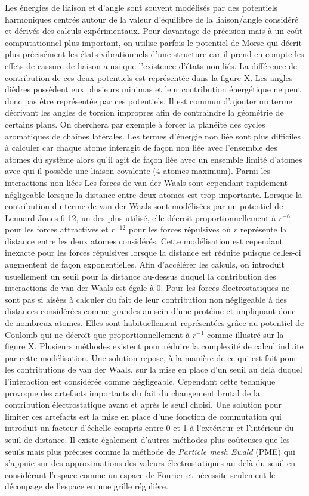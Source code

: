 Les énergies de liaison et d'angle sont souvent modélisés par des potentiels harmoniques centrés autour de la valeur d'équilibre de la liaison/angle considéré et dérivés des calculs expérimentaux. Pour davantage de précision mais à un coût computationnel plus important, on utilise parfois le potentiel de Morse qui décrit plus précisément les états vibrationnels d'une structure car il prend en compte les effets de cassure de liaison ainsi que l'existence d'états non liés. La différence de contribution de ces deux potentiels est représentée dans la figure X. Les angles dièdres possèdent eux plusieurs minimas et leur contribution énergétique ne peut donc pas être représentée par ces potentiels. Il est commun d'ajouter un terme décrivant les angles de torsion impropres afin de contraindre la géométrie de certains plans. On cherchera par exemple à forcer la planéité des cycles aromatiques de chaînes latérales.
Les termes d'énergie non liée sont plus difficiles à calculer car chaque atome interagit de façon non liée avec l'ensemble des atomes du système alors qu'il agit de façon liée avec un ensemble limité d'atomes avec qui il possède une liaison covalente (4 atomes maximum). 
Parmi les interactions non liées Les forces de van der Waals sont cependant rapidement négligeable lorsque la distance entre deux atomes est trop importante. Lorsque la contribution du terme de van der Waals sont modélisées par un potentiel de Lennard-Jones 6-12, un des plus utilisé, elle décroit proportionnellement à $r^{-6}$ pour les forces attractives et $r^{-12}$ pour les forces répulsives où $r$ représente la distance entre les deux atomes considérés. Cette modélisation est cependant inexacte pour les forces répulsives lorsque la distance est réduite puisque celles-ci augmentent de façon exponentielles. Afin d'accélérer les calculs, on introduit usuellement un seuil pour la distance au-dessus duquel la contribution des interactions de van der Waals est égale à 0.
Pour les forces électrostatiques ne sont pas si aisées à calculer du fait de leur contribution non négligeable à des distances considérées comme grandes au sein d'une protéine et impliquant donc de nombreux atomes. Elles sont habituellement représentées grâce au potentiel de Coulomb qui ne décroît que proportionnellement à $r^{-1}$ comme illustré sur la figure X. Plusieurs méthodes existent pour réduire la complexité de calcul induite par cette modélisation. Une solution repose, à la manière de ce qui est fait pour les contributions de van der Waals, sur la mise en place d'un seuil au delà duquel l'interaction est considérée comme négligeable. Cependant cette technique provoque des artefacts importants du fait du changement brutal de la contribution électrostatique avant et après le seuil choisi. Une solution pour limiter ces artefacts est la mise en place d'une fonction de commutation qui introduit un facteur d'échelle compris entre 0 et 1 à l'extérieur et l'intérieur du seuil de distance. Il existe également d'autres méthodes plus coûteuses que les seuils mais plus précises comme la méthode de \textit{Particle mesh Ewald} (PME) qui s'appuie sur des approximations des valeurs électrostatiques au-delà du seuil en considérant l'espace comme un espace de Fourier et nécessite seulement le découpage de l'espace en une grille régulière.

